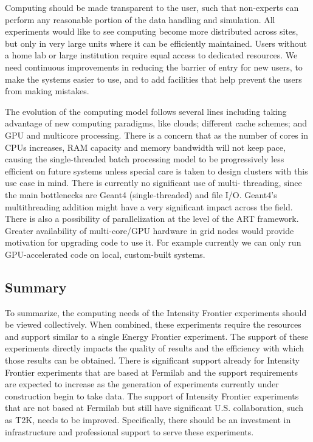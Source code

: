 Computing should be made transparent to the user, such that non-experts can
perform any reasonable portion of the data handling and simulation. All
experiments would like to see computing become more distributed across sites,
but only in very large units where it can be efficiently maintained.  Users
without a home lab or large institution require equal access to dedicated
resources. We need  continuous improvements in reducing the barrier of entry
for new users, to make the systems easier to use, and to add facilities that
help prevent the users from making mistakes.

The evolution of the computing model follows several lines including taking
advantage of new computing paradigms, like clouds; different cache schemes; and
GPU and multicore processing. There is a concern that as the number of cores
in CPUs increases, RAM capacity and memory bandwidth will not keep pace,
causing the single-threaded batch processing model to be progressively less
efficient on future systems unless special care is taken to design clusters
with this use case in mind. There is currently no significant use of multi-
threading, since the main bottlenecks are Geant4 (single-threaded) and file
I/O. Geant4's multithreading addition might have a very significant impact
across the field. There is also a possibility of parallelization at the level
of the ART framework. Greater availability of multi-core/GPU hardware in grid
nodes would provide motivation for upgrading code to use it. For example
currently we can only run GPU-accelerated code on local, custom-built systems.

\subsection{Summary}
To summarize, the computing needs of the Intensity Frontier experiments should be viewed
collectively.  When combined, these experiments require the resources and
support similar to a single Energy Frontier experiment.  The support of these experiments
directly impacts the quality of results and the efficiency with which those
results can be obtained.  There is significant support already for Intensity Frontier
experiments that are based at Fermilab and the support requirements are
expected to increase as the generation of experiments currently under
construction begin to take data.  The support of Intensity Frontier experiments that are not
based at Fermilab but still have significant U.S. collaboration, such as T2K,
needs to be improved.  Specifically, there should be an investment in
infrastructure and professional support to serve these experiments.

